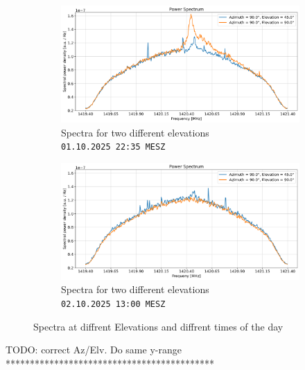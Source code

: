 \begin{figure}[ht]
\centering
\begin{subfigure}[t]{0.49\textwidth}
    \centering
    \includegraphics[width=0.9\linewidth]{assets/elev_spectrum_night.png}
    \caption{Spectra for two different elevations\\ \texttt{01.10.2025 22:35 MESZ}}
\end{subfigure}
\begin{subfigure}[t]{0.49\textwidth}
    \centering
    \includegraphics[width=0.9\linewidth]{assets/elev_spectrum_day.png}
    \caption{Spectra for two different elevations\\ \texttt{02.10.2025 13:00 MESZ}}
\end{subfigure}
\caption{Spectra at diffrent Elevations and diffrent times of the day}
\label{fig:elev_spectra}
\end{figure}


TODO: correct Az/Elv. Do same y-range *******************************************